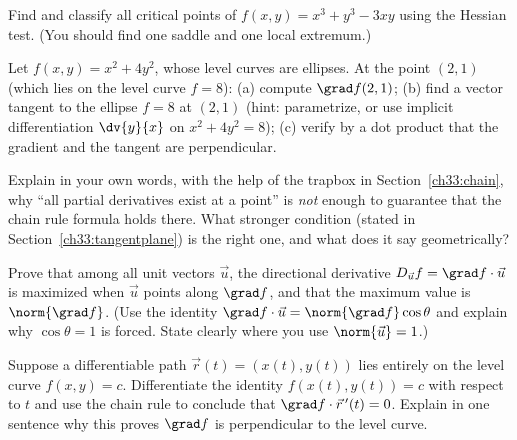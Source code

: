 \begin{exercise}
\label{ch33:exr-classify}
Find and classify all critical points of $f(x,y) = x^3 + y^3 - 3xy$ using the
Hessian test. (You should find one saddle and one local extremum.)
\end{exercise}

\begin{exercise}
\label{ch33:exr-perp}
Let $f(x,y) = x^2 + 4y^2$, whose level curves are ellipses. At the point
$(2,1)$ (which lies on the level curve $f=8$): (a) compute $\grad f(2,1)$;
(b) find a vector tangent to the ellipse $f=8$ at $(2,1)$ (hint: parametrize, or
use implicit differentiation $\dv{y}{x}$ on $x^2+4y^2=8$); (c) verify by a dot
product that the gradient and the tangent are perpendicular.
\end{exercise}

\begin{exercise}
\label{ch33:exr-concept}
Explain in your own words, with the help of the trapbox in
Section~\ref{ch33:chain}, why ``all partial derivatives exist at a point'' is
\emph{not} enough to guarantee that the chain rule formula holds there. What
stronger condition (stated in Section~\ref{ch33:tangentplane}) is the right one,
and what does it say geometrically?
\end{exercise}

\begin{exercise}
\label{ch33:exr-proof}
Prove that among all unit vectors $\vec u$, the directional derivative
$D_{\vec u} f = \grad f \cdot \vec u$ is maximized when $\vec u$ points along
$\grad f$, and that the maximum value is $\norm{\grad f}$. (Use the
identity $\grad f \cdot \vec u = \norm{\grad f}\cos\theta$ and explain why
$\cos\theta = 1$ is forced. State clearly where you use $\norm{\vec u} = 1$.)
\end{exercise}

\begin{exercise}
\label{ch33:exr-proofperp}
Suppose a differentiable path $\vec r(t) = (x(t), y(t))$ lies entirely on the level
curve $f(x,y) = c$. Differentiate the identity $f(x(t),y(t)) = c$ with respect to
$t$ and use the chain rule to conclude that $\grad f \cdot \vec r\,'(t) = 0$.
Explain in one sentence why this proves $\grad f$ is perpendicular to the level
curve.
\end{exercise}
